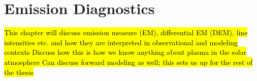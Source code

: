 \chapter{Emission Diagnostics}
\label{ch:emission}
\hl{This chapter will discuss emission measure (EM), differential EM (DEM), line intensities etc.
and how they are interpreted in observational and modeling contexts
Discuss how this is how we know anything about plasma in the solar atmosphere
Can discuss forward modeling as well; this sets us up for the rest of the thesis}